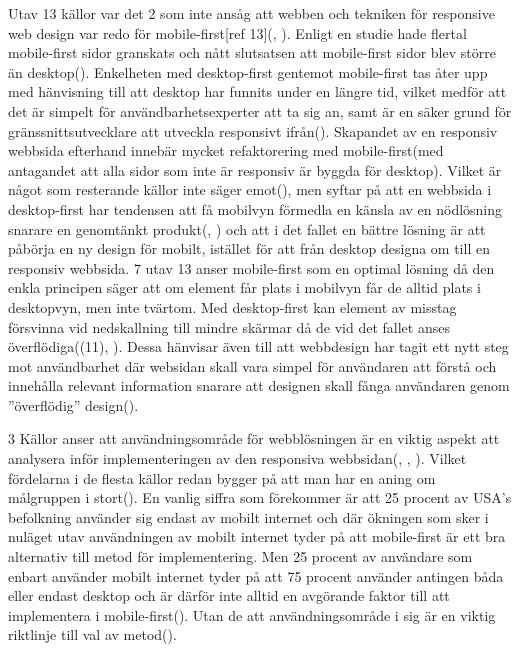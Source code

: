 \documentclass[11pt]{article}
\begin{document}
 Utav 13 källor var det 2 som inte ansåg att webben och tekniken för responsive web design var redo för mobile-first[ref 13](\cite{cloudfour}, \cite{armstrong}). Enligt en studie hade flertal mobile-first sidor granskats och nått slutsatsen att mobile-first sidor blev större än desktop(\cite{cloudfour}). Enkelheten med desktop-first gentemot mobile-first tas åter upp med hänvisning till att desktop har funnits under en längre tid, vilket medför att det är simpelt för användbarhetsexperter att ta sig an, samt är en säker grund för gränssnittsutvecklare att utveckla responsivt ifrån(\cite{armstrong}). Skapandet av en responsiv webbsida efterhand innebär mycket refaktorering med mobile-first(med antagandet att alla sidor som inte är responsiv är byggda för desktop). Vilket är något som resterande källor inte säger emot(\cite{neocreo}), men syftar på att en webbsida i desktop-first har tendensen att få mobilvyn förmedla en känsla av en nödlösning snarare en genomtänkt produkt(\cite{designshack}, \cite{othermedia}) och att i det fallet en bättre lösning är att påbörja en ny design för mobilt, istället för att från desktop designa om till en responsiv webbsida.
7 utav 13 anser mobile-first som en optimal lösning då den enkla principen säger att om element får plats i mobilvyn får de alltid plats i desktopvyn, men inte tvärtom. Med desktop-first kan element av misstag försvinna vid nedskallning till mindre skärmar då de vid det fallet anses överflödiga(\cite{blogskent}(11), \cite{responsivedesign}). Dessa hänvisar även till att webbdesign har tagit ett nytt steg mot användbarhet där websidan skall vara simpel för användaren att förstå och innehålla relevant information snarare att designen skall fånga användaren genom ”överflödig” design(\cite{blogskent}). 

3 Källor anser att användningsområde för webblösningen är en viktig aspekt att analysera inför implementeringen av den responsiva webbsidan(\cite{neocreo}, \cite{marcuspope}, \cite{designshack}). Vilket fördelarna i de flesta källor redan bygger på att man har en aning om målgruppen i stort(\cite{zurbword}). En vanlig siffra som förekommer är att 25 procent av USA’s befolkning använder sig endast av mobilt internet och där ökningen som sker i nuläget utav användningen av mobilt internet tyder på att mobile-first är ett bra alternativ till metod för implementering.  Men 25 procent av användare som enbart använder mobilt internet tyder på att 75 procent använder antingen båda eller endast desktop och är därför inte alltid en avgörande faktor till att implementera i mobile-first(\cite{marcuspope}). Utan de att användningsområde i sig är en viktig riktlinje till val av metod(\cite{neocreo}).  
\end{document}
